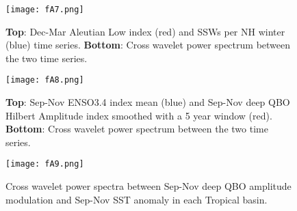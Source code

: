 \documentclass[wcd, manuscript]{copernicus}
\begin{document}
\begin{center}
\begin{figure}[h!]
\texttt{[image: fA7.png]}
\caption{\textbf{Top}: Dec-Mar Aleutian Low index (red) and SSWs per NH winter (blue) time series. \textbf{Bottom}: Cross wavelet power spectrum between the two time series.}
\end{figure}
\end{center}

\begin{center}
\begin{figure}[h!]
\texttt{[image: fA8.png]}
\caption{\textbf{Top}: Sep-Nov ENSO3.4 index  mean (blue) and Sep-Nov deep QBO Hilbert Amplitude index smoothed with a 5 year window (red). \textbf{Bottom}: Cross wavelet power spectrum between the two time series.}
\label{fig1}
\end{figure}
\end{center}

\begin{center}
\begin{figure}[h!]
\texttt{[image: fA9.png]}
\caption{Cross wavelet power spectra between Sep-Nov deep QBO amplitude modulation and Sep-Nov SST anomaly in each Tropical basin.}
\label{fig1}
\end{figure}
\end{center}
\end{document}
